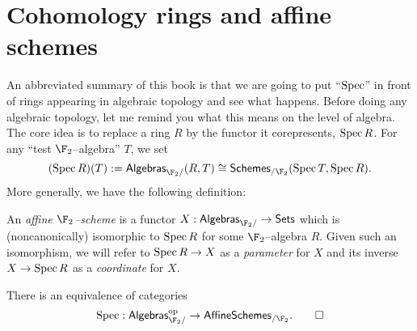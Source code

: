 \section{Cohomology rings and affine schemes}\label{SectionSchemesOverF2}

An abbreviated summary of this book is that we are going to put ``$\operatorname{Spec}$'' in front of rings appearing in algebraic topology and see what happens.  Before doing any algebraic topology, let me remind you what this means on the level of algebra.  The core idea is to replace a ring $R$ by the functor it corepresents, $\operatorname{Spec} R$.  For any ``test $\F_2$--algebra'' $T$, we set \[(\Spec R)(T) := \CatOf{Algebras}_{\F_2/}(R, T) \cong \CatOf{Schemes}_{/\F_2}(\Spec T, \Spec R).\]  More generally, we have the following definition:
\begin{definition}\label{DefnAffineF2Scheme}
An \textit{affine $\F_2$--scheme} is a functor $X: \CatOf{Algebras}_{\F_2/} \to \CatOf{Sets}$ which is (noncanonically) isomorphic to $\operatorname{Spec} R$ for some $\F_2$--algebra $R$.  Given such an isomorphism, we will refer to $\operatorname{Spec} R \to X$ as a \textit{parameter} for $X$ and its inverse $X \to \operatorname{Spec} R$ as a \textit{coordinate} for $X$.
\end{definition}

\begin{lemma}
There is an equivalence of categories \[\Spec: \CatOf{Algebras}_{\F_2/}^{\mathrm{op}} \to \CatOf{AffineSchemes}_{/\F_2}. \qed\]
\end{lemma}

